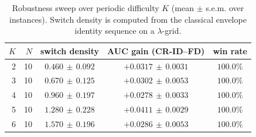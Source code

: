 \begin{table}[t]
\centering
\small
\begin{tabular}{r r c c c}
\toprule
$K$ & $N$ & switch density & AUC gain (CR-ID--FD) & win rate \\
\midrule
2 & 10 & $0.460\,\pm\,0.092$ & $+0.0317\,\pm\,0.0031$ & $100.0\%$ \\
3 & 10 & $0.670\,\pm\,0.125$ & $+0.0302\,\pm\,0.0053$ & $100.0\%$ \\
4 & 10 & $0.960\,\pm\,0.197$ & $+0.0278\,\pm\,0.0033$ & $100.0\%$ \\
5 & 10 & $1.280\,\pm\,0.228$ & $+0.0411\,\pm\,0.0029$ & $100.0\%$ \\
6 & 10 & $1.570\,\pm\,0.196$ & $+0.0286\,\pm\,0.0053$ & $100.0\%$ \\
\bottomrule
\end{tabular}
\caption{Robustness sweep over periodic difficulty $K$ (mean $\pm$ s.e.m. over instances). Switch density is computed from the classical envelope identity sequence on a $\lambda$-grid.}
\label{tab:exp4_K_sweep}
\end{table}
